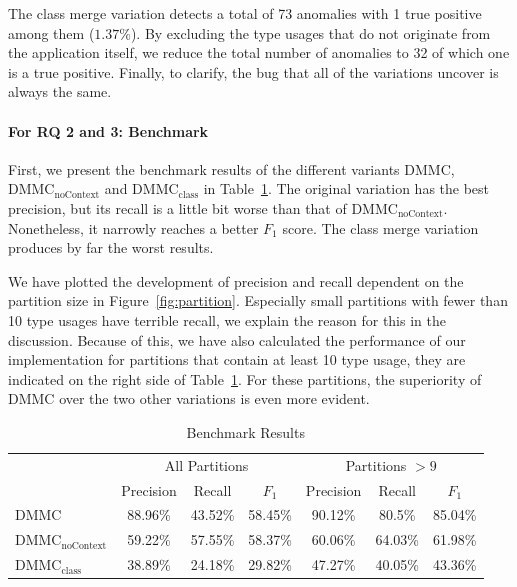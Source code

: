 The class merge variation detects a total of 73 anomalies with 1 true positive among them ($1.37\%$).
By excluding the type usages that do not originate from the application itself, we reduce the total number of anomalies to 32 of which one is a true positive.
Finally, to clarify, the bug that all of the variations uncover is always the same.

\paragraph{For RQ 2 and 3: Benchmark}

First, we present the benchmark results of the different variants $\text{DMMC}$, $\text{DMMC}_\text{noContext}$ and $\text{DMMC}_\text{class}$ in Table~\ref{fig:bench}.
The original variation has the best precision, but its recall is a little bit worse than that of $\text{DMMC}_\text{noContext}$.
Nonetheless, it narrowly reaches a better $F_1$ score.
The class merge variation produces by far the worst results.

We have plotted the development of precision and recall dependent on the partition size in Figure~\ref{fig:partition}.
Especially small partitions with fewer than 10 type usages have terrible recall, we explain the reason for this in the discussion.
Because of this, we have also calculated the performance of our implementation for partitions that contain at least 10 type usage, they are indicated on the right side of Table~\ref{fig:bench}.
For these partitions, the superiority of $\text{DMMC}$ over the two other variations is even more evident.

\begin{table}[t]
    \centering
    \begin{tabular}[h]{l|c|c|c|c|c|c}
\toprule
 & \multicolumn{3}{c|}{All Partitions}      & \multicolumn{3}{c}{Partitions $> 9$} \\
                                 & Precision & Recall  & $F_1$   & Precision & Recall  & $F_1$ \\
\midrule
$\text{DMMC}$                    & 88.96\%   & 43.52\% & 58.45\% & 90.12\%   & 80.5\%  & 85.04\% \\
$\text{DMMC}_\text{noContext}$   & 59.22\%   & 57.55\% & 58.37\% & 60.06\%   & 64.03\% & 61.98\% \\
$\text{DMMC}_\text{class}$       & 38.89\%   & 24.18\% & 29.82\% & 47.27\%   & 40.05\% & 43.36\% \\
\bottomrule
    \end{tabular}
    \caption{Benchmark Results}\label{fig:bench}
\end{table}

